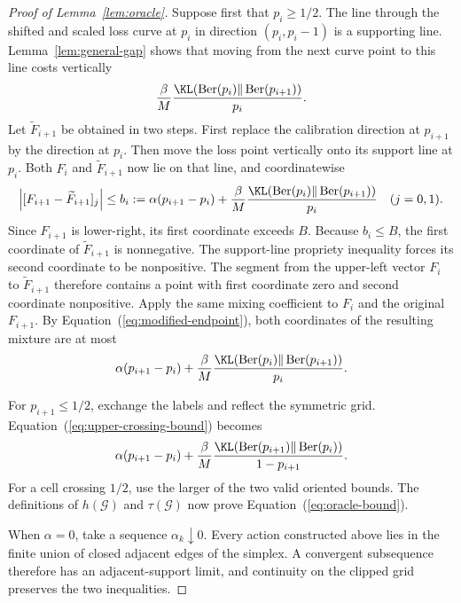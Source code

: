 \documentclass{article}
\newcommand{\Ber}{\operatorname{Ber}}
\begin{document}
\begin{proof}[Proof of Lemma~\ref{lem:oracle}]
Suppose first that $p_i\geq1/2$. The line through the shifted and scaled loss curve at $p_i$ in direction $(p_i,p_i-1)$ is a supporting line. Lemma~\ref{lem:general-gap} shows that moving from the next curve point to this line costs vertically
\begin{equation}
 \frac{\beta}{M}
 \frac{\KL(\Ber(p_i)\Vert\Ber(p_{i+1}))}{p_i}.
 \label{eq:upper-cell-cost}
\end{equation}
Let $\widetilde F_{i+1}$ be obtained in two steps. First replace the calibration direction at $p_{i+1}$ by the direction at $p_i$. Then move the loss point vertically onto its support line at $p_i$. Both $F_i$ and $\widetilde F_{i+1}$ now lie on that line, and coordinatewise
\begin{equation}
 \left|[F_{i+1}-\widetilde F_{i+1}]_j\right|
 \leq b_i
 :=\alpha(p_{i+1}-p_i)+
 \frac{\beta}{M}
 \frac{\KL(\Ber(p_i)\Vert\Ber(p_{i+1}))}{p_i}
 \quad (j=0,1).
 \label{eq:modified-endpoint}
\end{equation}
Since $F_{i+1}$ is lower-right, its first coordinate exceeds $B$. Because $b_i\leq B$, the first coordinate of $\widetilde F_{i+1}$ is nonnegative. The support-line propriety inequality forces its second coordinate to be nonpositive. The segment from the upper-left vector $F_i$ to $\widetilde F_{i+1}$ therefore contains a point with first coordinate zero and second coordinate nonpositive. Apply the same mixing coefficient to $F_i$ and the original $F_{i+1}$. By Equation~(\ref{eq:modified-endpoint}), both coordinates of the resulting mixture are at most
\begin{equation}
 \alpha(p_{i+1}-p_i)+
 \frac{\beta}{M}
 \frac{\KL(\Ber(p_i)\Vert\Ber(p_{i+1}))}{p_i}.
 \label{eq:upper-crossing-bound}
\end{equation}

For $p_{i+1}\leq1/2$, exchange the labels and reflect the symmetric grid. Equation~(\ref{eq:upper-crossing-bound}) becomes \[ \alpha(p_{i+1}-p_i)+ \frac{\beta}{M} \frac{\KL(\Ber(p_{i+1})\Vert\Ber(p_i))} {1-p_{i+1}}. \] For a cell crossing $1/2$, use the larger of the two valid oriented bounds. The definitions of $h(\mathcal G)$ and $\tau(\mathcal G)$ now prove Equation~(\ref{eq:oracle-bound}).

When $\alpha=0$, take a sequence $\alpha_k\downarrow0$. Every action constructed above lies in the finite union of closed adjacent edges of the simplex. A convergent subsequence therefore has an adjacent-support limit, and continuity on the clipped grid preserves the two inequalities.
\end{proof}
\end{document}
